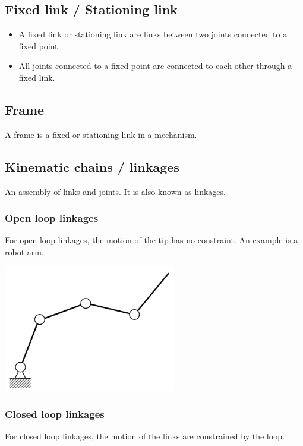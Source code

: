 \documentclass[11pt]{article}
\begin{document}
\subsection{Fixed link / Stationing link}
\label{sec:org498cfe9}
\begin{itemize}
\item A fixed link or stationing link are links between two joints connected to a fixed point.
\item All joints connected to a fixed point are connected to each other through a fixed link.
\end{itemize}
\subsection{Frame}
\label{sec:org184ed0f}
A frame is a fixed or stationing link in a mechanism.
\subsection{Kinematic chains / linkages}
\label{sec:org1bcfbcc}
An assembly of links and joints. It is also known as linkages.
\subsubsection{Open loop linkages}
\label{sec:orga64eb82}
For open loop linkages, the motion of the tip has no constraint. An example is a robot arm.

\begin{center}
\includegraphics[height=15em]{./images/open-loop-linkage-image.png}
\end{center}

 \newpage
\subsubsection{Closed loop linkages}
\label{sec:orge60d95c}
For closed loop linkages, the motion of the links are constrained by the loop.
\end{document}
